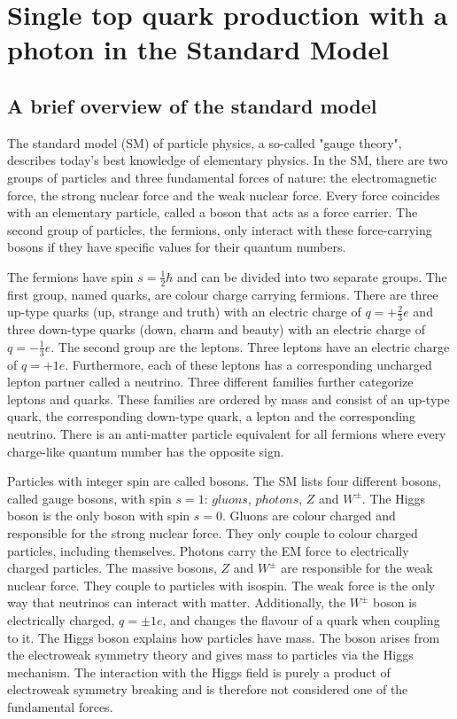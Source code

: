 
\chapter{Single top quark production with a photon in the Standard Model}
\label{chap:tqgamma_production}
\section{A brief overview of the standard model}

The standard model (SM) of particle physics, a so-called "gauge theory",  describes today's best knowledge of elementary physics. 
In the SM, there are two groups of particles and three fundamental forces of nature: the electromagnetic force, the strong nuclear force and the weak nuclear force. 
Every force coincides with an elementary particle, called a boson that acts as a force carrier. The second group of particles, the fermions, only interact with these force-carrying bosons if they have specific values for their quantum numbers.

The fermions have spin $s = \frac{1}{2} \hbar$ and can be divided into two separate groups. The first group, named quarks, are colour charge carrying fermions. 
There are three up-type quarks (up, strange and truth) with an electric charge of $q = +\frac{2}{3}e$ and three down-type quarks (down, charm and beauty) with an electric charge of $q = -\frac{1}{3}e$. 
The second group are the leptons. Three leptons have an electric charge of $q = +1e$. Furthermore, each of these leptons has a corresponding uncharged lepton partner called a neutrino.
Three different families further categorize leptons and quarks. These families are ordered by mass and consist of an up-type quark, the corresponding down-type quark, a lepton and the corresponding neutrino. 
There is an anti-matter particle equivalent for all fermions where every charge-like quantum number has the opposite sign. 

Particles with integer spin are called bosons. The SM lists four different bosons, called gauge bosons, with spin $s = 1$: $gluons$, $photons$, $Z$ and $W^{\pm}$. The Higgs boson is the only boson with spin $s=0$.
Gluons are colour charged and responsible for the strong nuclear force. They only couple to colour charged particles, including themselves. Photons carry the EM force to electrically charged particles. The massive bosons, $Z$ and $W^{\pm}$ are responsible for the weak nuclear force. They couple to particles with isospin. The weak force is the only way that neutrinos can interact with matter. Additionally, the $W^{\pm}$ boson is electrically charged, $q = \pm 1e$, and changes the flavour of a quark when coupling to it.
The Higgs boson explains how particles have mass. The boson arises from the electroweak symmetry theory and gives mass to particles via the Higgs mechanism. The interaction with the Higgs field is purely a product of electroweak symmetry breaking and is therefore not considered one of the fundamental forces.

